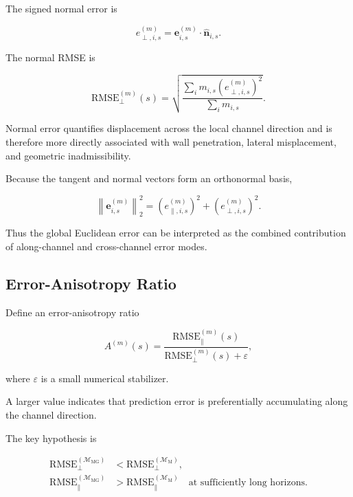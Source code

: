 \documentclass[11pt]{article}
\newcommand{\nhat}{\hat{\mathbf{n}}}
\newcommand{\Mmark}{\mathcal{M}_{\mathrm{M}}}
\newcommand{\Mgeom}{\mathcal{M}_{\mathrm{MG}}}
\begin{document}
The signed normal error is

\begin{equation}
e_{\perp,i,s}^{(m)}
=
\mathbf{e}_{i,s}^{(m)}
\cdot
\nhat_{i,s}.
\end{equation}

The normal RMSE is

\begin{equation}
\mathrm{RMSE}_{\perp}^{(m)}(s)
=
\sqrt{
\frac{
\sum_i m_{i,s}
\left(
e_{\perp,i,s}^{(m)}
\right)^2
}{
\sum_i m_{i,s}
}
}.
\end{equation}

Normal error quantifies displacement across the local channel direction and is therefore more directly associated with wall penetration, lateral misplacement, and geometric inadmissibility.

Because the tangent and normal vectors form an orthonormal basis,

\begin{equation}
\left\|
\mathbf{e}_{i,s}^{(m)}
\right\|_2^2
=
\left(
e_{\parallel,i,s}^{(m)}
\right)^2
+
\left(
e_{\perp,i,s}^{(m)}
\right)^2.
\end{equation}

Thus the global Euclidean error can be interpreted as the combined contribution of along-channel and cross-channel error modes.

\subsection{Error-Anisotropy Ratio}

Define an error-anisotropy ratio

\begin{equation}
A^{(m)}(s)
=
\frac{
\mathrm{RMSE}_{\parallel}^{(m)}(s)
}{
\mathrm{RMSE}_{\perp}^{(m)}(s)+\varepsilon
},
\end{equation}

where \(\varepsilon\) is a small numerical stabilizer.

A larger value indicates that prediction error is preferentially accumulating along the channel direction.

The key hypothesis is

\begin{align}
\mathrm{RMSE}_{\perp}^{(\Mgeom)}
&<
\mathrm{RMSE}_{\perp}^{(\Mmark)},\\
\mathrm{RMSE}_{\parallel}^{(\Mgeom)}
&>
\mathrm{RMSE}_{\parallel}^{(\Mmark)}
\quad
\text{at sufficiently long horizons}.
\end{align}
\end{document}
